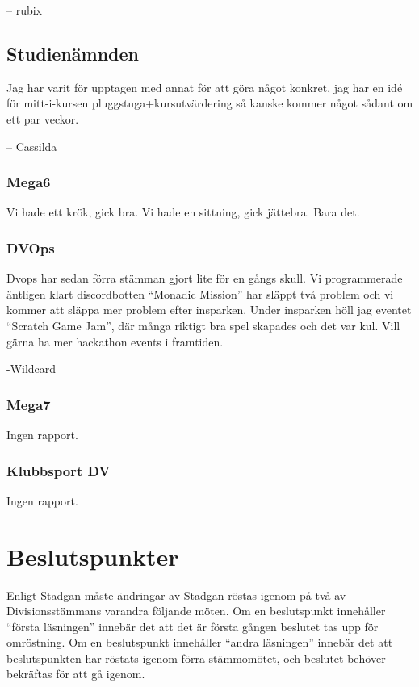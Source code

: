 \documentclass[protokoll]{dvd}
\begin{document}
-- rubix

\subsection{Studienämnden}
Jag har varit för upptagen med annat för att göra något konkret, jag har en idé för mitt-i-kursen pluggstuga+kursutvärdering så kanske kommer något sådant om ett par veckor. 

-- Cassilda

\subsubsection*{Mega6}
Vi hade ett krök, gick bra. Vi hade en sittning, gick jättebra. Bara det.

\subsubsection*{DVOps}
Dv\textunderscore ops har sedan förra stämman gjort lite för en gångs skull. Vi programmerade äntligen klart discordbotten “Monadic Mission” har släppt två problem och vi kommer att släppa mer problem efter insparken. Under insparken höll jag eventet “Scratch Game Jam”, där många riktigt bra spel skapades och det var kul. Vill gärna ha mer hackathon events i framtiden. 

-Wildcard


\subsubsection*{Mega7}
Ingen rapport.

\subsubsection*{Klubbsport DV}
Ingen rapport.


\newpage

\section{Beslutspunkter}

Enligt Stadgan måste ändringar av Stadgan röstas igenom på två av Divisionsstämmans varandra följande möten.
Om en beslutspunkt innehåller ``första läsningen'' innebär det att det är första gången beslutet tas upp för omröstning.
Om en beslutspunkt innehåller ``andra läsningen'' innebär det att beslutspunkten har röstats igenom förra stämmomötet, och beslutet behöver bekräftas för att gå igenom.
\end{document}
